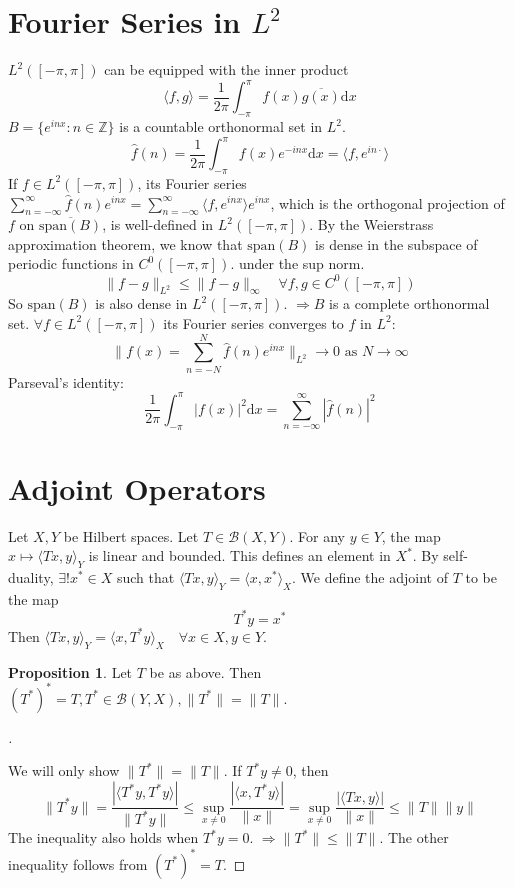 \documentclass{article}
\theoremstyle{definition}
\newtheorem{prop}{Proposition}
\newenvironment{proofs}[1][\proofname]{%
  \begin{proof}[#1]$ $\par\nobreak\ignorespaces
}{%
  \end{proof}
}
\newcommand{\B}{\mathcal B}
\begin{document}
\section{Fourier Series in $L^2$}

$L^2([-\pi, \pi])$ can be equipped with the inner product
\[
	\langle f, g \rangle = \frac{1}{2 \pi} \int_{- \pi}^\pi f(x) \overline{g(x)} \mathrm{d} x
\]
$B = \{e^{inx}: n \in \mathbb{Z}\}$ is a countable orthonormal set in $L^2$.
\[
	\hat{f}(n) = \frac{1}{2 \pi} \int_{- \pi}^\pi f(x) e^{-inx} \mathrm{d} x = \langle f, e^{i n \cdot} \rangle
\]
If $f \in L^2([-\pi, \pi])$, its Fourier series $\sum_{n = -\infty}^\infty \hat{f}(n) e^{inx} = \sum_{n = -\infty}^\infty \langle f, e^{inx} \rangle e^{inx}$, which is the orthogonal projection of $f$ on $\overline{\text{span}(B)}$, is well-defined in $L^2([-\pi, \pi])$.
By the Weierstrass approximation theorem, we know that $\text{span}(B)$ is dense in the subspace of periodic functions in $C^0([-\pi, \pi])$. under the sup norm.
\[
	\|f - g\|_{L^2} \leq \|f - g\|_{\infty} \quad \forall f, g \in C^0([-\pi, \pi])
\]
So $\text{span}(B)$ is also dense in $L^2([-\pi, \pi])$.
$\Rightarrow B$ is a complete orthonormal set.
$\forall f \in L^2([-\pi, \pi])$ its Fourier series converges to $f$ in $L^2$:
\[
	\|f(x) = \sum_{n = -N}^N \hat{f}(n) e^{inx}\|_{L^2} \to 0 \text{ as }N \to \infty
\]
Parseval's identity:
\[
	\frac{1}{2 \pi} \int_{- \pi}^\pi |f(x)|^2 \mathrm{d} x = \sum_{n = -\infty}^\infty |\hat{f}(n)|^2
\]

\section{Adjoint Operators}

Let $X, Y$ be Hilbert spaces.
Let $T \in \B(X, Y)$.
For any $y \in Y$, the map $x \mapsto \langle T x, y \rangle_{Y}$ is linear and bounded.
This defines an element in $X^*$.
By self-duality, $\exists ! x^* \in X$ such that $\langle T x, y \rangle_Y = \langle x, x^* \rangle_X$.
We define the adjoint of $T$ to be the map
\[
	T^* y = x^*
\]
Then $\langle T x, y \rangle_Y = \langle x, T^* y \rangle_X \quad \forall x \in X, y \in Y$.

\begin{prop}
	Let $T$ be as above. 
	Then $(T^*)^* = T, T^* \in \B(Y, X), \|T^*\| = \|T\|$.
\end{prop}

\begin{proofs}
	We will only show $\|T^*\| = \|T\|$.
	If $T^* y \neq 0$, then
	\[
		\|T^* y \| = \frac{|\langle T^* y, T^* y \rangle|}{\|T^* y\|} \leq \sup_{x \neq 0} \frac{|\langle x, T^* y \rangle|}{\|x\|} = \sup_{x \neq 0} \frac{|\langle T x, y \rangle |}{\|x\|} \leq \|T\| \|y\|
	\]
	The inequality also holds when $T^* y = 0$.
	$\Rightarrow \|T^*\| \leq \|T\|$.
	The other inequality follows from $(T^*)^* = T$.
\end{proofs}
\end{document}
